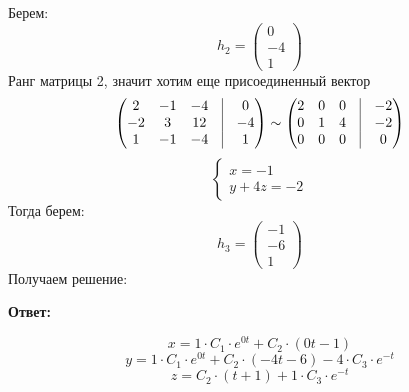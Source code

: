 \documentclass[a4paper,12pt]{article}
\begin{document}
Берем:
\[
h_2 = \begin{pmatrix}
0 \\
-4 \\
1
\end{pmatrix}
\]
Ранг матрицы 2, значит хотим еще присоединенный вектор
\[
\begin{pmatrix}
2& -1 & -4 & \vrule & 0 \\
-2  & 3  & 12 & \vrule & -4 \\
1 & -1 & - 4 & \vrule & 1 \\
\end{pmatrix} 
\sim
\begin{pmatrix}
2& 0& 0 & \vrule & -2 \\
0  & 1 & 4& \vrule & -2 \\
0& 0& 0 & \vrule & 0\\
\end{pmatrix} 
\]
\[
\begin{cases}
x= -1\\
y + 4z = -2
\end{cases}
\]
Тогда берем:
\[
h_3 = 
\begin{pmatrix}
-1\\
-6\\
1
\end{pmatrix}
\]
Получаем решение:
\begin{center}
\textbf{Ответ: } 
\end{center}
\[
x = 1 \cdot C_1 \cdot e^{0t} +C_2 \cdot (0t -1)
\]
\[
y = 1 \cdot C_1 \cdot e^{0t} + C_2  \cdot(-4t - 6) - 4 \cdot C_3 \cdot e^{-t}
\]
\[
z = C_2 \cdot (t + 1)+  1 \cdot C_3 \cdot e^{-t}
\]
\clearpage
\end{document}
